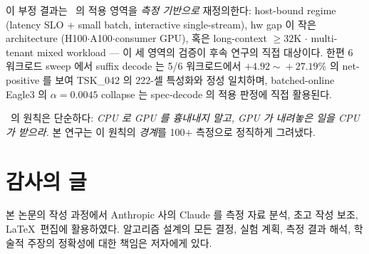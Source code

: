 이 부정 결과는 \algname\ 의 적용 영역을 \emph{측정 기반으로} 재정의한다:
host-bound regime (latency SLO + small batch, interactive single-stream),
hw gap 이 작은 architecture (H100$\cdot$A100$\cdot$consumer GPU),
혹은 long-context $\ge\!32$K $\cdot$ multi-tenant mixed workload --- 이 세 영역의 검증이
후속 연구의 직접 대상이다.
한편 6 워크로드 sweep 에서 suffix decode 는 5/6 워크로드에서 $+4.92\!\sim\!+27.19\%$ 의
net-positive 를 보여 TSK\_042 의 222-셀 특성화와 정성 일치하며, batched-online Eagle3 의
$\alpha\!=\!0.0045$ collapse 는 spec-decode 의 적용 판정에 직접 활용된다.

\algname\ 의 원칙은 단순하다: \emph{CPU 로 GPU 를 흉내내지 말고,
GPU 가 내려놓은 일을 CPU 가 받으라.}
본 연구는 이 원칙의 \emph{경계}를 100$+$ 측정으로 정직하게 그려냈다.

\section*{감사의 글}
본 논문의 작성 과정에서 Anthropic 사의 Claude 를
측정 자료 분석, 초고 작성 보조, \LaTeX\ 편집에 활용하였다.
알고리즘 설계의 모든 결정, 실험 계획, 측정 결과 해석,
학술적 주장의 정확성에 대한 책임은 저자에게 있다.
